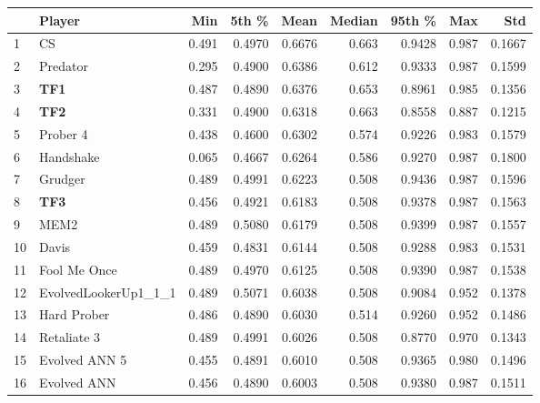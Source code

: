 \begin{tabular}{llrrrrrrr}
\toprule
{} &                Player &    Min &   5th \% &    Mean &  Median &  95th \% &    Max &     Std \\
\midrule
1  &                    CS &  0.491 &  0.4970 &  0.6676 &   0.663 &  0.9428 &  0.987 &  0.1667 \\
2  &              Predator &  0.295 &  0.4900 &  0.6386 &   0.612 &  0.9333 &  0.987 &  0.1599 \\
3  &                   \textbf{TF1} &  0.487 &  0.4890 &  0.6376 &   0.653 &  0.8961 &  0.985 &  0.1356 \\
4  &                   \textbf{TF2} &  0.331 &  0.4900 &  0.6318 &   0.663 &  0.8558 &  0.887 &  0.1215 \\
5  &              Prober 4 &  0.438 &  0.4600 &  0.6302 &   0.574 &  0.9226 &  0.983 &  0.1579 \\
6  &             Handshake &  0.065 &  0.4667 &  0.6264 &   0.586 &  0.9270 &  0.987 &  0.1800 \\
7  &               Grudger &  0.489 &  0.4991 &  0.6223 &   0.508 &  0.9436 &  0.987 &  0.1596 \\
8  &                   \textbf{TF3} &  0.456 &  0.4921 &  0.6183 &   0.508 &  0.9378 &  0.987 &  0.1563 \\
9  &                  MEM2 &  0.489 &  0.5080 &  0.6179 &   0.508 &  0.9399 &  0.987 &  0.1557 \\
10 &                 Davis &  0.459 &  0.4831 &  0.6144 &   0.508 &  0.9288 &  0.983 &  0.1531 \\
11 &          Fool Me Once &  0.489 &  0.4970 &  0.6125 &   0.508 &  0.9390 &  0.987 &  0.1538 \\
12 &  EvolvedLookerUp1\_1\_1 &  0.489 &  0.5071 &  0.6038 &   0.508 &  0.9084 &  0.952 &  0.1378 \\
13 &           Hard Prober &  0.486 &  0.4890 &  0.6030 &   0.514 &  0.9260 &  0.952 &  0.1486 \\
14 &           Retaliate 3 &  0.489 &  0.4991 &  0.6026 &   0.508 &  0.8770 &  0.970 &  0.1343 \\
15 &         Evolved ANN 5 &  0.455 &  0.4891 &  0.6010 &   0.508 &  0.9365 &  0.980 &  0.1496 \\
16 &           Evolved ANN &  0.456 &  0.4890 &  0.6003 &   0.508 &  0.9380 &  0.987 &  0.1511 \\
\bottomrule
\end{tabular}
